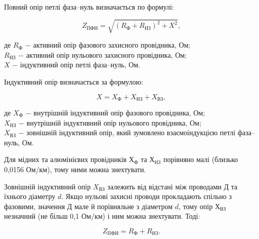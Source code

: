 Повний опір петлі фаза–нуль визначається по формулі:

\begin{equation}\label{eq:work6}
	Z_{\text{ПФН}} = \sqrt{(R_{\text{Ф}} + R_{\text{НЗ}})^{2} + X^{2}},
\end{equation}

\noindent де $R_{\text{Ф}}$ $-$ активний опір фазового захисного провідника, Ом; \\
\hspace*{15pt} $R_{\text{НЗ}}$ $-$ активний опір нульового захисного провідника, Ом; \\
\hspace*{15pt} $X$ $-$  індуктивний опір петлі фаза–нуль, Ом. 

\vspace{1.5em}

Індуктивний опір визначається за формулою:

\begin{equation}\label{eq:work7}
	X = X_{\text{Ф}} + X_{\text{НЗ}} + X_{\text{ВЗ}},
\end{equation}

\noindent де $X_{\text{Ф}}$ $-$ внутрішній індуктивний опір фазового провідника,  Ом; \\
\hspace*{15pt} $X_{\text{НЗ}}$ $-$ внутрішній індуктивний опір нульового провідника,  Ом; \\
\hspace*{15pt} $X_{\text{ВЗ}}$ $-$ зовнішній індуктивний опір, який зумовлено взаємоіндукцією \newline
\hspace*{15pt}петлі фаза–нуль, Ом.

\vspace{1.5em}

Для мідних та алюмінієвих провідників $Х_{\text{Ф}}$ та $Х_{\text{НЗ}}$ порівняно малі (близько 0,0156 Ом/км), тому ними можна знехтувати.

Зовнішній індуктивний опір $X_{\text{ВЗ}}$ залежить від відстані між проводами Д та їхнього діаметру $d$. Якщо нульові захисні проводи прокладають спільно з фазовими, значення Д  мале й порівняльне з діаметром $d$, тому опір $Х_{\text{ВЗ}}$ незначний (не більш 0,1 Ом/км) і ним можна знехтувати. Тоді:

\begin{equation}\label{eq:work8}
	Z_{\text{ПФН}} = R_{\text{Ф}} + R_{\text{НЗ}}.
\end{equation}

